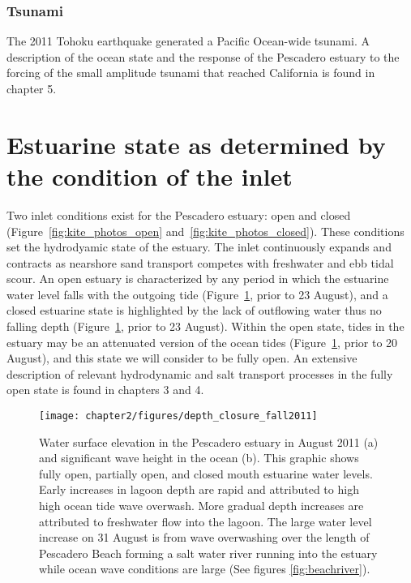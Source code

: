 \subsubsection{Tsunami}
The 2011 Tohoku earthquake generated a Pacific Ocean-wide tsunami. A description of the ocean state and the response of the Pescadero estuary to the forcing of the small amplitude tsunami that reached California is found in chapter 5.



\section{Estuarine state as determined by the condition of the inlet}
\label{betterlabelmaybe}

Two inlet conditions exist for the Pescadero estuary: open and closed (Figure~\ref{fig:kite_photos_open} and~\ref{fig:kite_photos_closed}).  These conditions set the hydrodyamic state of the estuary. The inlet continuously expands and contracts as nearshore sand transport competes with freshwater and ebb tidal scour. An open estuary is characterized by any period in which the estuarine water level falls with the outgoing tide (Figure~\ref{fig:depthclosuref11}, prior to 23 August), and a closed estuarine state is highlighted by the lack of outflowing water thus no falling depth (Figure~\ref{fig:depthclosuref11}, prior to 23 August). Within the open state, tides in the estuary may be an attenuated version of the ocean tides (Figure~\ref{fig:depthclosuref11}, prior to 20 August), and this state we will consider to be fully open. An extensive description of relevant hydrodynamic and salt transport processes in the fully open state is found in chapters 3 and 4.

\begin{figure}
\centering
	\texttt{[image: chapter2/figures/depth\_closure\_fall2011]} \caption{Water surface elevation in the Pescadero estuary in August 2011 (a) and significant wave height in the ocean (b). This graphic shows fully open, partially open, and closed mouth estuarine water levels. Early increases in lagoon depth are rapid and attributed to high high ocean tide wave overwash. More gradual depth increases are attributed to freshwater flow into the lagoon. The large water level increase on 31 August is from wave overwashing over the length of Pescadero Beach forming a salt water river running into the estuary while ocean wave conditions are large (See figures \ref{fig:beachriver}).}
	\label{fig:depthclosuref11} 
\end{figure}

